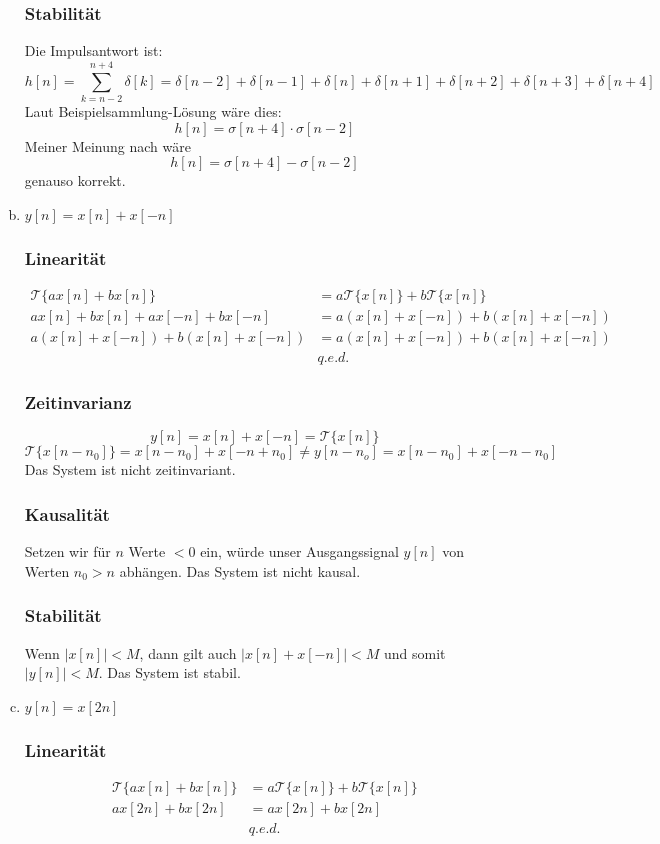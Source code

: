 \begin{enumerate}[a)]
	\subsubsection*{Stabilität} 
		Die Impulsantwort ist:
		\[
			h[n] = \sum_{k=n-2}^{n+4}\delta [k] = \delta [n-2] + \delta [n-1] + \delta [n] + \delta [n+1] + \delta [n+2] + \delta [n+3] + \delta [n+4]
		\]
		Laut Beispielsammlung-Lösung wäre dies:
		\[
			h[n] = \sigma[n+4]\cdot \sigma[n-2]
		\]
		Meiner Meinung nach wäre
		\[
			h[n] = \sigma[n+4]-\sigma[n-2]
		\]
		genauso korrekt.
	\item $y[n] = x[n] + x[-n]$
	\subsubsection*{Linearität}
		\begin{align*}
			\mathcal{T} \{ ax[n]+bx[n] \} &= a\mathcal{T} \{ x[n] \}+ b \mathcal{T} \{ x[n] \} \\
			ax[n]+bx[n]+ax[-n]+bx[-n] &= a(x[n]+x[-n])+b(x[n]+x[-n]) \\
			a(x[n]+x[-n])+b(x[n]+x[-n]) &= a(x[n]+x[-n])+b(x[n]+x[-n]) \\
			&q.e.d.
		\end{align*}
	\subsubsection*{Zeitinvarianz}
		\[ y[n] = x[n] + x[-n] = \mathcal{T} \{ x[n] \} \]
		\[ \mathcal{T} \{ x[n-n_0] \} = x[n-n_0] + x[-n+n_0] \neq y[n-n_o] = x[n-n_0] + x[-n-n_0] \]
		Das System ist nicht zeitinvariant.
	\subsubsection*{Kausalität}
		Setzen wir für $n$ Werte $<0$ ein, würde unser Ausgangssignal $y[n]$ von Werten $n_0 > n$ abhängen. Das System ist nicht kausal.
	\subsubsection*{Stabilität}
		Wenn $|x[n]|<M$, dann gilt auch $|x[n]+x[-n]| < M$ und somit $|y[n]|<M$. Das System ist stabil.
	\item $y[n] = x[2n]$
	\subsubsection*{Linearität}
		\begin{align*}
			\mathcal{T} \{ ax[n]+bx[n] \} &= a\mathcal{T} \{ x[n] \}+ b \mathcal{T} \{ x[n] \} \\
			ax[2n]+bx[2n] &= ax[2n]+bx[2n] \\
			&q.e.d.
		\end{align*}

\end{enumerate}
